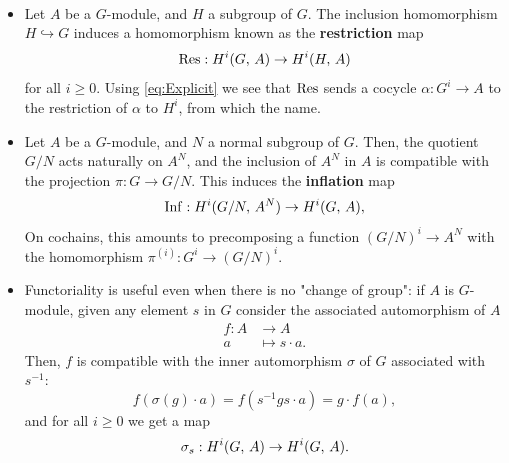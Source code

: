 \documentclass[a4paper, oneside]{memoir}
\begin{document}
\begin{definition}\
    \begin{itemize}
        \item   Let $A$ be a $G$-module, and $H$ a subgroup of $G$. The inclusion homomorphism $H\hookrightarrow G$ induces a homomorphism known as the \textbf{restriction} map
              \[
                  \operatorname{Res}: H^{i}( G, \, A )\to H^{i}( H, \, A )
              \]
              for all $i\geq 0$. Using \eqref{eq:Explicit} we see that $\operatorname{Res}$ sends a cocycle $\alpha: G^i\to A$ to the restriction of $\alpha$ to $H^i$, from which the name.
        \item Let $A$ be a $G$-module, and $N$ a normal subgroup of $G$. Then, the quotient $G/N$ acts naturally on $A^N$, and the inclusion of $A^N$ in $A$ is compatible with the projection $\pi: G\to G/N$. This induces the \textbf{inflation} map
              \[
                  \operatorname{Inf}: H^{i}( G/N, \, A^N )\to H^{i}( G, \, A ),
              \]
              On cochains, this amounts to precomposing a function $(G/N)^i\to A^N$ with the homomorphism $\pi^{(i)}: G^i\to (G/N)^i$.

        \item Functoriality is useful even when there is no "change of group": if $A$ is $G$-module, given any element $s$ in $G$ consider the associated automorphism of $A$
              \begin{align*}
                  f: A & \to A            \\
                  a    & \mapsto s\cdot a
                  .\end{align*}
              Then, $f$ is compatible with the inner automorphism $\sigma$ of $G$ associated with $s^{-1}$:
              \[
                  f(\sigma(g)\cdot a)=f(s^{-1}gs\cdot a)=g\cdot f(a),
              \]
              and for all $i\geq 0$ we get a map
              \[
                  \sigma_s: H^{i}( G, \, A )\to H^{i}( G, \, A )
                  .\]
    \end{itemize}
\end{definition}
\end{document}
